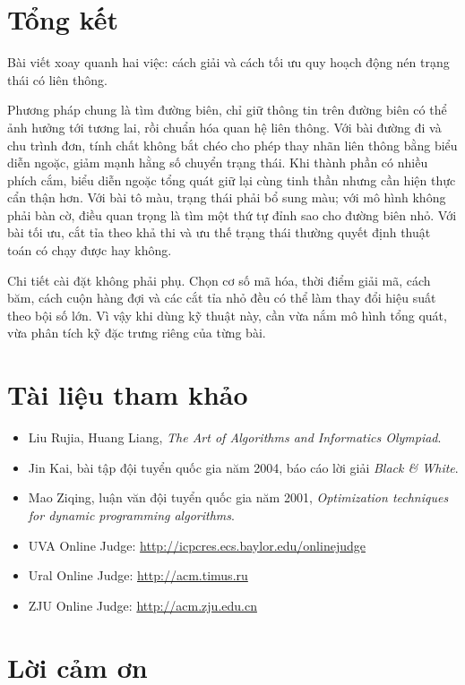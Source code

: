 \documentclass[11pt]{article}
\begin{document}
\section{Tổng kết}

Bài viết xoay quanh hai việc: cách giải và cách tối ưu quy hoạch động nén
trạng thái có liên thông.

Phương pháp chung là tìm đường biên, chỉ giữ thông tin trên đường biên có thể
ảnh hưởng tới tương lai, rồi chuẩn hóa quan hệ liên thông. Với bài đường đi và
chu trình đơn, tính chất không bắt chéo cho phép thay nhãn liên thông bằng
biểu diễn ngoặc, giảm mạnh hằng số chuyển trạng thái. Khi thành phần có nhiều
phích cắm, biểu diễn ngoặc tổng quát giữ lại cùng tinh thần nhưng cần hiện
thực cẩn thận hơn. Với bài tô màu, trạng thái phải bổ sung màu; với mô hình
không phải bàn cờ, điều quan trọng là tìm một thứ tự đỉnh sao cho đường biên
nhỏ. Với bài tối ưu, cắt tỉa theo khả thi và ưu thế trạng thái thường quyết
định thuật toán có chạy được hay không.

Chi tiết cài đặt không phải phụ. Chọn cơ số mã hóa, thời điểm giải mã, cách
băm, cách cuộn hàng đợi và các cắt tỉa nhỏ đều có thể làm thay đổi hiệu suất
theo bội số lớn. Vì vậy khi dùng kỹ thuật này, cần vừa nắm mô hình tổng quát,
vừa phân tích kỹ đặc trưng riêng của từng bài.

\section*{Tài liệu tham khảo}

\begin{itemize}
  \item Liu Rujia, Huang Liang, \textit{The Art of Algorithms and Informatics
  Olympiad}.
  \item Jin Kai, bài tập đội tuyển quốc gia năm 2004, báo cáo lời giải
  \textit{Black \& White}.
  \item Mao Ziqing, luận văn đội tuyển quốc gia năm 2001,
  \textit{Optimization techniques for dynamic programming algorithms}.
  \item UVA Online Judge: \url{http://icpcres.ecs.baylor.edu/onlinejudge}
  \item Ural Online Judge: \url{http://acm.timus.ru}
  \item ZJU Online Judge: \url{http://acm.zju.edu.cn}
\end{itemize}

\section*{Lời cảm ơn}
\end{document}

